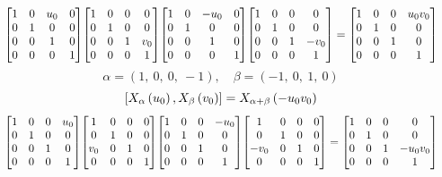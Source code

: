 \documentclass[11pt]{article}
\theoremstyle{definition}
\begin{document}
\[
\scaletoalign{\textwidth}{{\left[\begin{matrix}1 & 0 & u_{0} & 0\\0 & 1 & 0 & 0\\0 & 0 & 1 & 0\\0 & 0 & 0 & 1\end{matrix}\right]} {\left[\begin{matrix}1 & 0 & 0 & 0\\0 & 1 & 0 & 0\\0 & 0 & 1 & v_{0}\\0 & 0 & 0 & 1\end{matrix}\right]} {\left[\begin{matrix}1 & 0 & - u_{0} & 0\\0 & 1 & 0 & 0\\0 & 0 & 1 & 0\\0 & 0 & 0 & 1\end{matrix}\right]} {\left[\begin{matrix}1 & 0 & 0 & 0\\0 & 1 & 0 & 0\\0 & 0 & 1 & - v_{0}\\0 & 0 & 0 & 1\end{matrix}\right]} = {\left[\begin{matrix}1 & 0 & 0 & u_{0} v_{0}\\0 & 1 & 0 & 0\\0 & 0 & 1 & 0\\0 & 0 & 0 & 1\end{matrix}\right]}}
\]
\[
\alpha = \left( 1, \  0, \  0, \  -1\right), \quad \beta = \left( -1, \  0, \  1, \  0\right)
\]
\[
\scaletoalign{\textwidth}{\left[ X_{\alpha}\left(u_{0}\right), X_{\beta}\left(v_{0}\right) \right] = X_{\alpha + \beta}\left(- u_{0} v_{0}\right)}
\]
\[
\scaletoalign{\textwidth}{{\left[\begin{matrix}1 & 0 & 0 & u_{0}\\0 & 1 & 0 & 0\\0 & 0 & 1 & 0\\0 & 0 & 0 & 1\end{matrix}\right]} {\left[\begin{matrix}1 & 0 & 0 & 0\\0 & 1 & 0 & 0\\v_{0} & 0 & 1 & 0\\0 & 0 & 0 & 1\end{matrix}\right]} {\left[\begin{matrix}1 & 0 & 0 & - u_{0}\\0 & 1 & 0 & 0\\0 & 0 & 1 & 0\\0 & 0 & 0 & 1\end{matrix}\right]} {\left[\begin{matrix}1 & 0 & 0 & 0\\0 & 1 & 0 & 0\\- v_{0} & 0 & 1 & 0\\0 & 0 & 0 & 1\end{matrix}\right]} = {\left[\begin{matrix}1 & 0 & 0 & 0\\0 & 1 & 0 & 0\\0 & 0 & 1 & - u_{0} v_{0}\\0 & 0 & 0 & 1\end{matrix}\right]}}
\]
\end{document}
